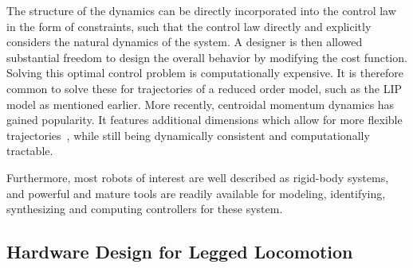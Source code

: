 The structure of the dynamics can be directly incorporated into the control law in the form of constraints, such that the control law directly and explicitly considers the natural dynamics of the system.
A designer is then allowed substantial freedom to design the overall behavior by modifying the cost function.
Solving this optimal control problem is computationally expensive. It is therefore common to solve these for trajectories of a reduced order model, such as the LIP model as mentioned earlier. More recently, centroidal momentum dynamics has gained popularity. It features additional dimensions which allow for more flexible trajectories~\cite{dai2014whole,koolen2016balance,ponton2016convex}, while still being dynamically consistent and computationally tractable.

Furthermore, most robots of interest are well described as rigid-body systems, and powerful and mature tools are readily available for modeling, identifying, synthesizing and computing controllers for these system.


\subsection{Hardware Design for Legged Locomotion}


